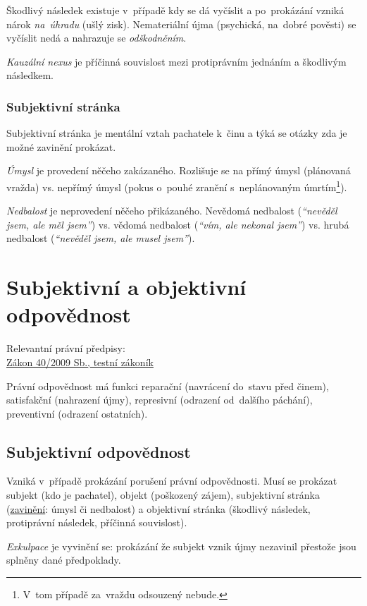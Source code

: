 Škodlivý následek existuje v~případě kdy se dá vyčíslit a po~prokázání vzniká nárok \emph{na~úhradu} (ušlý zisk).
Nemateriální újma (psychická, na~dobré pověsti) se vyčíslit nedá a nahrazuje se \emph{odškodněním}.

\emph{Kauzální nexus} je příčinná souvislost mezi protiprávním jednáním a škodlivým následkem.


\subsubsection{Subjektivní stránka}

Subjektivní stránka je mentální vztah pachatele k~činu a týká se otázky zda je možné zavinění prokázat.

\emph{Úmysl} je provedení něčeho zakázaného.
Rozlišuje se na přímý úmysl (plánovaná vražda) vs. nepřímý úmysl (pokus o~pouhé zranění s~neplánovaným úmrtím\footnote{V~tom případě za~vraždu odsouzený nebude.}).

\emph{Nedbalost} je neprovedení něčeho přikázaného.
Nevědomá nedbalost (\emph{\enquote{nevěděl jsem, ale měl jsem}}) vs.
vědomá nedbalost (\emph{\enquote{vím, ale nekonal jsem}}) vs.
hrubá nedbalost (\emph{\enquote{nevěděl jsem, ale musel jsem}}).


\clearpage
\section{Subjektivní a objektivní odpovědnost}

{}Relevantní právní předpisy:
\\\href{https://www.zakonyprolidi.cz/cs/2009-40}{Zákon 40/2009 Sb., testní zákoník}

Právní odpovědnost má funkci reparační (navrácení do~stavu před činem), satisfakční (nahrazení újmy), represivní (odrazení od~dalšího páchání), preventivní (odrazení ostatních).


\subsection{Subjektivní odpovědnost}

Vzniká v~případě prokázání porušení právní odpovědnosti.
Musí se prokázat subjekt (kdo je pachatel), objekt (poškozený zájem), subjektivní stránka (\underline{zavinění}: úmysl či nedbalost) a objektivní stránka (škodlivý následek, protiprávní následek, příčinná souvislost).

\emph{Exkulpace} je vyvinění se: prokázání že subjekt vznik újmy nezavinil přestože jsou splněny dané předpoklady.


